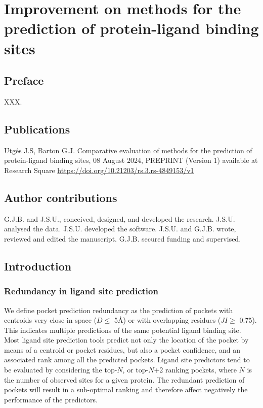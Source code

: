 \chapter{Improvement on methods for the prediction of protein-ligand binding sites}

\section*{Preface}

XXX.

\section*{Publications}

Utgés J.S, Barton G.J. Comparative evaluation of methods for the prediction of protein-ligand binding sites, 08 August 2024, PREPRINT (Version 1) available at Research Square \url{https://doi.org/10.21203/rs.3.rs-4849153/v1}

\section*{Author contributions}

G.J.B. and J.S.U., conceived, designed, and developed the research. J.S.U. analysed the data. J.S.U. developed the software. J.S.U. and G.J.B. wrote, reviewed and edited the manuscript. G.J.B. secured funding and supervised.

\section{Introduction}

\subsection{Redundancy in ligand site prediction}

We define pocket prediction redundancy as the prediction of pockets with centroids very close in space ($D \leq$ 5\AA{}) or with overlapping residues ($JI \geq$ 0.75). This indicates multiple predictions of the same potential ligand binding site. Most ligand site prediction tools predict not only the location of the pocket by means of a centroid or pocket residues, but also a pocket confidence, and an associated rank among all the predicted pockets. Ligand site predictors tend to be evaluated by considering the top-$N$, or top-$N$+2 ranking pockets, where $N$ is the number of observed sites for a given protein. The redundant prediction of pockets will result in a sub-optimal ranking and therefore affect negatively the performance of the predictors.

